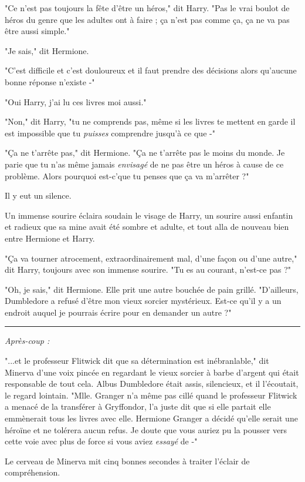 "Ce n'est pas toujours la fête d'être un héros," dit Harry. "Pas le vrai boulot de héros du genre que les adultes ont à faire ; ça n'est pas comme ça, ça ne va pas être aussi simple."

"Je sais," dit Hermione.

"C'est difficile et c'est douloureux et il faut prendre des décisions alors qu'aucune bonne réponse n'existe -"

"Oui Harry, j'ai lu ces livres moi aussi."

"Non," dit Harry, "tu ne comprends pas, même si les livres te mettent en garde il est impossible que tu \emph{puisses}  comprendre jusqu'à ce que -"

"Ça ne t'arrête pas," dit Hermione. "Ça ne t'arrête pas le moins du monde. Je parie que tu n'as même jamais \emph{envisagé}  de ne pas être un héros à cause de ce problème. Alors pourquoi est-c'que tu penses que ça va m'arrêter ?"

Il y eut un silence.

Un immense sourire éclaira soudain le visage de Harry, un sourire aussi enfantin et radieux que sa mine avait été sombre et adulte, et tout alla de nouveau bien entre Hermione et Harry.

"Ça va tourner atrocement, extraordinairement mal, d'une façon ou d'une autre," dit Harry, toujours avec son immense sourire. "Tu es au courant, n'est-ce pas ?"

"Oh, je sais," dit Hermione. Elle prit une autre bouchée de pain grillé. "D'ailleurs, Dumbledore a refusé d'être mon vieux sorcier mystérieux. Est-ce qu'il y a un endroit auquel je pourrais écrire pour en demander un autre ?"
\par\noindent\rule{\textwidth}{0.4pt}
\emph{Après-coup :} 

"...et le professeur Flitwick dit que sa détermination est inébranlable," dit Minerva d'une voix pincée en regardant le vieux sorcier à barbe d'argent qui était responsable de tout cela. Albus Dumbledore était assis, silencieux, et il l'écoutait, le regard lointain. "Mlle. Granger n'a même pas cillé quand le professeur Flitwick a menacé de la transférer à Gryffondor, l'a juste dit que si elle partait elle emmènerait tous les livres avec elle. Hermione Granger a décidé qu'elle serait une héroïne et ne tolérera aucun refus. Je doute que vous auriez pu la pousser vers cette voie avec plus de force si vous aviez \emph{essayé}  de -"

Le cerveau de Minerva mit cinq bonnes secondes à traiter l'éclair de compréhension.

